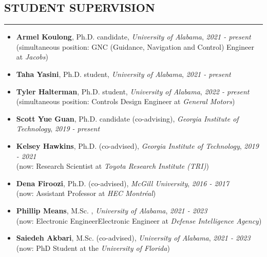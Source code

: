 \documentclass{article}
\begin{document}
\vspace{-9pt}



\subsection*{STUDENT SUPERVISION}
\vspace{-2pt}
\hrule
\vspace{10pt}


\begin{itemize}
\setlength\itemsep{-3 pt}
\item \textbf{Armel Koulong}, Ph.D. candidate, \textit{University of Alabama}, \hfill {\em 2021 - present} \\
(simultaneous position: GNC (Guidance, Navigation and Control) Engineer at
\textit{Jacobs})
\item \textbf{Taha Yasini}, Ph.D. student, \textit{University of Alabama}, \hfill {\em 2021 - present} 
\item \textbf{Tyler Halterman}, Ph.D. student, \textit{University of Alabama}, \hfill {\em 2022 - present} 
\\
(simultaneous position: Controls Design Engineer at \textit{General Motors})
\item \textbf{Scott Yue Guan}, Ph.D. candidate (co-advising), \textit{Georgia Institute of Technology}, \hfill {\em 2019 - present} 
\item \textbf{Kelsey Hawkins}, Ph.D.  (co-advised), \textit{Georgia Institute of Technology}, \hfill {\em 2019 - 2021} \\ (now: Research Scientist at \textit{Toyota Research Institute (TRI)})
\item \textbf{Dena Firoozi}, Ph.D.  (co-advised), \textit{McGill University}, \hfill {\em 2016 - 2017} 
\\ (now: Assistant Professor at \textit{HEC Montr\'eal})
\item \textbf{Phillip Means}, M.Sc. , \textit{University of Alabama}, \hfill {\em 2021 - 2023} \\
(now: Electronic EngineerElectronic Engineer at \textit{Defense Intelligence Agency})
\item \textbf{Saiedeh Akbari}, M.Sc. (co-advised), \textit{University of Alabama}, \hfill {\em 2021 - 2023} \\
(now: PhD Student at the \textit{University of Florida})
\end{itemize}
\end{document}
